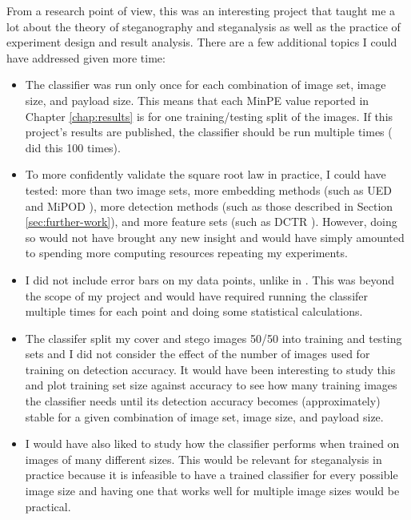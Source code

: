 \documentclass[11pt,a4paper,twoside,openright]{report}
\begin{document}
From a research point of view, this was an interesting project that taught me a lot about the theory of steganography and steganalysis as well as the practice of experiment design and result analysis. There are a few additional topics I could have addressed given more time:
\begin{itemize}
	\item The classifier was run only once for each combination of image set, image size, and payload size. This means that each MinPE value reported in Chapter \ref{chap:results} is for one training/testing split of the images. If this project's results are published, the classifier should be run multiple times (\cite{2008-paper} did this 100 times).
	\item To more confidently validate the square root law in practice, I could have tested: more than two image sets, more embedding methods (such as UED \cite{ued-embedding} and MiPOD \cite{mipod-embedding}), more detection methods (such as those described in Section \ref{sec:further-work}), and more feature sets (such as DCTR \cite{dctr-features}). However, doing so would not have brought any new insight and would have simply amounted to spending more computing resources repeating my experiments.
	\item I did not include error bars on my data points, unlike in \cite{2008-paper}. This was beyond the scope of my project and would have required running the classifer multiple times for each point and doing some statistical calculations.
	\item The classifer split my cover and stego images 50/50 into training and testing sets and I did not consider the effect of the number of images used for training on detection accuracy. It would have been interesting to study this and plot training set size against accuracy to see how many training images the classifier needs until its detection accuracy becomes (approximately) stable for a given combination of image set, image size, and payload size.
	\item I would have also liked to study how the classifier performs when trained on images of many different sizes. This would be relevant for steganalysis in practice because it is infeasible to have a trained classifier for every possible image size and having one that works well for multiple image sizes would be practical.
\end{itemize}

\end{document}
